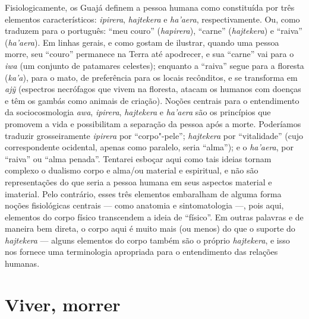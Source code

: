 Fisiologicamente, os Guajá definem a pessoa humana como constituída por
três elementos característicos: \emph{ipirera}, \emph{hajtekera} e
\emph{ha'aera}, respectivamente. Ou, como traduzem para o português:
``meu couro'' (\emph{hapirera}), ``carne'' (\emph{hajtekera}) e ``raiva''
(\emph{ha'aera}). Em linhas gerais, e como gostam de ilustrar, quando
uma pessoa morre, seu ``couro'' permanece na Terra até apodrecer, e sua
``carne'' vai para o \emph{iwa} (um conjunto de patamares celestes);
enquanto a ``raiva'' segue para a floresta (\emph{ka'a}), para o
mato, de preferência para os locais recônditos, e se transforma em \emph{ajỹ}
(espectros necrófagos que vivem na floresta, atacam os humanos com
doenças e têm os gambás como animais de criação). Noções centrais para o
entendimento da sociocosmologia \emph{awa}, \emph{ipirera},
\emph{hajtekera} e \emph{ha'aera} são os princípios que promovem a vida
e possibilitam a separação da pessoa após a morte. Poderíamos traduzir
grosseiramente \emph{ipirera} por ``corpo"-pele''; \emph{hajtekera} por
``vitalidade'' (cujo correspondente ocidental, apenas como paralelo, seria
``alma''); e o \emph{ha'aera}, por ``raiva'' ou ``alma penada''. Tentarei
esboçar aqui como tais ideias tornam complexo o dualismo corpo e alma/ou
material e espiritual, e não são representações do que seria a pessoa
humana em seus aspectos material e imaterial. Pelo contrário, esses três
elementos embaralham de alguma forma noções fisiológicas centrais --- como
anatomia e sintomatologia ---, pois aqui, elementos do corpo físico
transcendem a ideia de ``físico''. Em outras palavras e de maneira bem
direta, o corpo aqui é muito mais (ou menos) do que o suporte do
\emph{hajtekera} --- alguns elementos do corpo também são o próprio
\emph{hajtekera}, e isso nos fornece uma terminologia apropriada para o
entendimento das relações humanas.

\section{Viver, morrer}\label{viver-morrer}

